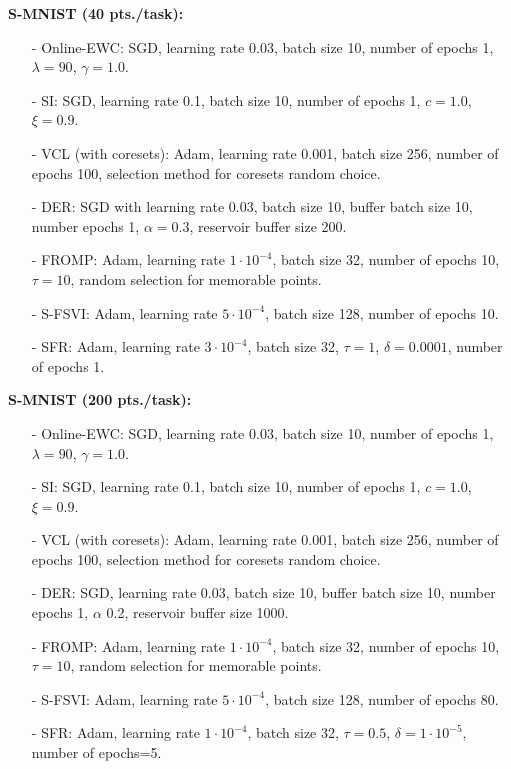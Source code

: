 \documentclass{article}
\begin{document}
\textbf{S-MNIST (40 pts./task):}
\begin{itemize}
	\item[-] Online-EWC: SGD, learning rate $0.03$, batch size  10, number of epochs 1, $\lambda=90$, $\gamma=1.0$.
	\item[-] SI: SGD, learning rate 0.1, batch size 10, number of epochs 1, $c=1.0$, $\xi=0.9$.
	\item[-] VCL (with coresets): Adam, learning rate 0.001, batch size 256, number of epochs 100, selection method for coresets random choice.
	\item[-] DER: SGD with learning rate 0.03, batch size 10, buffer batch size 10, number epochs 1, $\alpha=0.3$, reservoir buffer size 200.
	\item[-] FROMP: Adam, learning rate $1 \cdot 10^{-4}$, batch size 32, number of epochs 10, $\tau = 10$, random selection for memorable points.
	\item[-] S-FSVI: Adam, learning rate $5 \cdot 10^{-4}$, batch size 128, number of epochs 10.
	\item[-] SFR: Adam, learning rate $3 \cdot 10^{-4}$, batch size 32, $\tau=1$, $\delta=0.0001$,  number of epochs 1.
\end{itemize}


\textbf{S-MNIST (200 pts./task):}
\begin{itemize}
	\item[-] Online-EWC: SGD, learning rate $0.03$, batch size  10, number of epochs 1, $\lambda=90$, $\gamma=1.0$.
	\item[-] SI: SGD, learning rate 0.1, batch size 10, number of epochs 1, $c=1.0$, $\xi=0.9$.
	\item[-] VCL (with coresets): Adam, learning rate 0.001, batch size 256, number of epochs 100, selection method for coresets random choice.
	\item[-] DER: SGD, learning rate 0.03, batch size 10, buffer batch size 10, number epochs 1, $\alpha$ 0.2, reservoir buffer size 1000.
	\item[-] FROMP: Adam, learning rate $1 \cdot 10^{-4}$, batch size 32, number of epochs 10, $\tau = 10$, random selection for memorable points.
	\item[-] S-FSVI: Adam, learning rate $5 \cdot 10^{-4}$, batch size 128, number of epochs 80.
	\item[-] SFR: Adam, learning rate $1 \cdot 10^{-4}$, batch size 32, $\tau=0.5$, $\delta=1 \cdot 10^{-5}$, number of epochs=5.
\end{itemize}
 
\end{document}
